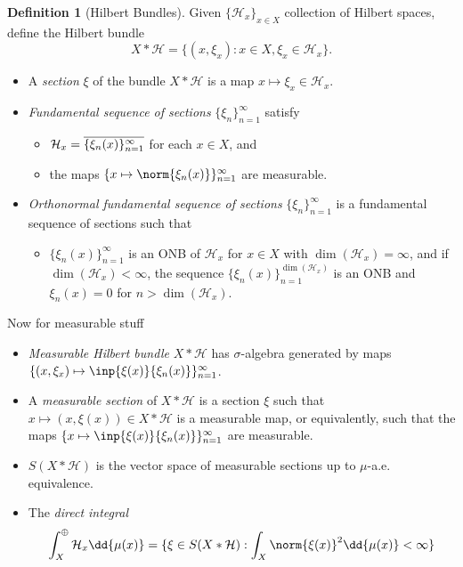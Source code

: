 \documentclass[12pt,letterpaper]{article}
\renewcommand{\H}{\mathcal{H}}
\let\Span\relax
\DeclareMathOperator{\Span}{Span}
\newcommand*\cls[1]{\overline{#1}}
\theoremstyle{definition}
\newtheorem{definition}{Definition}[]
\theoremstyle{plain}
\theoremstyle{remark}
\begin{document}
\begin{definition}[Hilbert Bundles]
    Given $ \{\H_{x}\}_{x\in X} $ collection of Hilbert spaces, define the Hilbert bundle
    \[
        X\ast \H = \{(x,\xi_{x}) : x\in X, \xi_{x}\in\H_{x}\}.
    \]
    \begin{itemize}
        \item A \textit{section} $ \xi $ of the bundle $ X\ast \H $ is a map $ x\mapsto \xi_{x}\in \H_{x} $.
        \item \textit{Fundamental sequence of sections} $ \{\xi_{n}\}_{n=1}^{\infty} $ satisfy
        \begin{itemize}
            \item $ \H_{x} = \cls{\Span\{\xi_{n}(x)\}_{n=1}^{\infty}} $ for each $ x\in X $, and
            \item the maps $ \{x\mapsto \norm{\xi_{n}(x)}\}_{n=1}^{\infty} $ are measurable.
        \end{itemize}
        \item \textit{Orthonormal fundamental sequence of sections} $ \{\xi_{n}\}_{n=1}^{\infty} $ is a fundamental sequence of sections such that
        \begin{itemize}
            \item $ \{\xi_{n}(x)\}_{n=1}^{\infty} $ is an ONB of $ \H_{x} $ for $ x\in X $ with $ \dim(\H_{x}) = \infty $, and if $ \dim(\H_{x})<\infty $, the sequence $ \{\xi_{n}(x)\}_{n=1}^{\dim(\H_{x})} $ is an ONB and $ \xi_{n}(x) = 0 $ for $ n>\dim(\H_{x}) $.
        \end{itemize}
    \end{itemize}
    Now for measurable stuff
    \begin{itemize}
        \item \textit{Measurable Hilbert bundle} $ X\ast \H $ has $ \sigma $-algebra generated by maps $ \{(x,\xi_{x}) \mapsto \inp{\xi(x)}{\xi_{n}(x)}\}_{n=1}^{\infty} $.
        \item A \textit{measurable section} of $ X\ast \H $ is a section $ \xi $ such that $ x\mapsto (x,\xi(x)) \in X\ast \H $ is a measurable map, or equivalently, such that the maps $ \{x\mapsto \inp{\xi(x)}{\xi_{n}(x)}\}_{n=1}^{\infty} $ are measurable.
        \item $ S(X\ast\H) $ is the vector space of measurable sections up to $ \mu $-a.e. equivalence.
        \item The \textit{direct integral}
            \[
                \int_{X}^{\oplus} \H_{x}\dd{\mu(x)} = \{\xi\in S(X\ast\H) : \int_{X}\norm{\xi(x)}^{2}\dd{\mu(x)}<\infty\}
\]
\end{itemize}
\end{definition}
\end{document}

